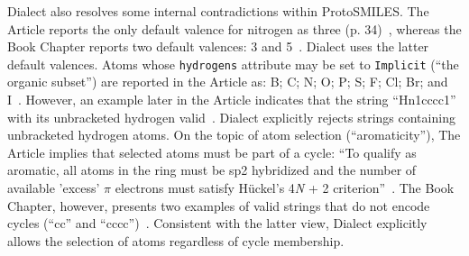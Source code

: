 \documentclass{article}
\def\ttt{\texttt}
\begin{document}
Dialect also resolves some internal contradictions within ProtoSMILES. The Article reports the only default valence for nitrogen as three (p. 34)~\cite[p.~34]{weininger:1988}, whereas the Book Chapter reports two default valences: 3 and 5~\cite[p.~84]{weininger:2003}. Dialect uses the latter default valences. Atoms whose \ttt{hydrogens} attribute may be set to \ttt{Implicit} (\enquote{the organic subset}) are reported in the Article as: B; C; N; O; P; S; F; Cl; Br; and I~\cite[p.~32]{weininger:2003}. However, an example later in the Article indicates that the string \enquote{Hn1cccc1} with its unbracketed hydrogen valid~\cite[p.~35]{weininger:1988}. Dialect explicitly rejects strings containing unbracketed hydrogen atoms. On the topic of atom selection (\enquote{aromaticity}), The Article implies that selected atoms must be part of a cycle: \enquote{To qualify as aromatic, all atoms in the ring must be sp2 hybridized and the number of available 'excess' $\pi$ electrons must satisfy Hückel's 4{\textit{N}} + 2 criterion}~\cite[p.~34]{weininger:1988}. The Book Chapter, however, presents two examples of valid strings that do not encode cycles (\enquote{cc} and \enquote{cccc})~\cite[p.~85]{weininger:2003}. Consistent with the latter view, Dialect explicitly allows the selection of atoms regardless of cycle membership.
\end{document}
